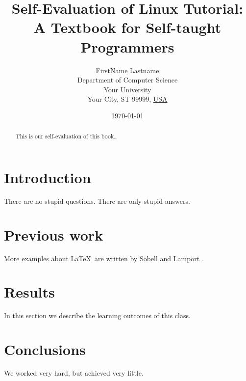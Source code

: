 \documentclass[12pt]{article}
\begin{document}
\title{Self-Evaluation of Linux Tutorial: A Textbook for Self-taught Programmers}
\author{
        FirstName Lastname\\
        Department of Computer Science\\
        Your University\\
        Your City, ST 99999, \underline{USA}
}
\date{\today}
\maketitle

\begin{abstract}
This is our self-evaluation of this book\ldots
\end{abstract}

\section{Introduction}
There are no stupid questions. There are only stupid answers.

\section{Previous work}\label{previous work}
More examples about \LaTeX\ are written by Sobell \cite{Sob09} and Lamport \cite{Lam86}.

\section{Results}\label{results}
In this section we describe the learning outcomes of this class.

\section{Conclusions}\label{conclusions}
We worked very hard, but achieved very little.



\end{document}
